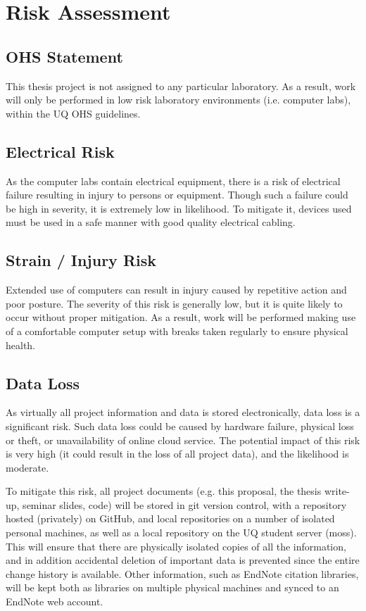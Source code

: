 \section{Risk Assessment}

\subsection{OHS Statement}

This thesis project is not assigned to any particular laboratory. As a result, work will only be performed in low risk laboratory environments (i.e. computer labs), within the UQ OHS guidelines.

\subsection{Electrical Risk}

As the computer labs contain electrical equipment, there is a risk of electrical failure resulting in injury to persons or equipment. Though such a failure could be high in severity, it is extremely low in likelihood. To mitigate it, devices used must be used in a safe manner with good quality electrical cabling.

\subsection{Strain / Injury Risk}

Extended use of computers can result in injury caused by repetitive action and poor posture. The severity of this risk is generally low, but it is quite likely to occur without proper mitigation. As a result, work will be performed making use of a comfortable computer setup with breaks taken regularly to ensure physical health.

\subsection{Data Loss}

As virtually all project information and data is stored electronically, data loss is a significant risk. Such data loss could be caused by hardware failure, physical loss or theft, or unavailability of online cloud service. The potential impact of this risk is very high (it could result in the loss of all project data), and the likelihood is moderate.

To mitigate this risk, all project documents (e.g. this proposal, the thesis write-up, seminar slides, code) will be stored in git version control, with a repository hosted (privately) on GitHub, and local repositories on a number of isolated personal machines, as well as a local repository on the UQ student server (moss). This will ensure that there are physically isolated copies of all the information, and in addition accidental deletion of important data is prevented since the entire change history is available. Other information, such as EndNote citation libraries, will be kept both as libraries on multiple physical machines and synced to an EndNote web account.

